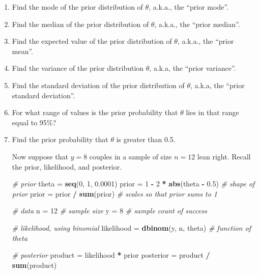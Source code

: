\documentclass[
]{book}
\newenvironment{Shaded}{\begin{snugshade}}{\end{snugshade}}
\newcommand{\CommentTok}[1]{\textcolor[rgb]{0.56,0.35,0.01}{\textit{#1}}}
\newcommand{\DecValTok}[1]{\textcolor[rgb]{0.00,0.00,0.81}{#1}}
\newcommand{\FloatTok}[1]{\textcolor[rgb]{0.00,0.00,0.81}{#1}}
\newcommand{\KeywordTok}[1]{\textcolor[rgb]{0.13,0.29,0.53}{\textbf{#1}}}
\newcommand{\NormalTok}[1]{#1}
\newcommand{\OperatorTok}[1]{\textcolor[rgb]{0.81,0.36,0.00}{\textbf{#1}}}
\newcommand{\StringTok}[1]{\textcolor[rgb]{0.31,0.60,0.02}{#1}}
\theoremstyle{definition}
\theoremstyle{definition}
\theoremstyle{definition}
\theoremstyle{remark}
\begin{document}
\begin{enumerate}
\def\labelenumi{\arabic{enumi}.}
\item
  Find the mode of the prior distribution of \(\theta\), a.k.a., the ``prior mode''.
\item
  Find the median of the prior distribution of \(\theta\), a.k.a., the ``prior median''.
\item
  Find the expected value of the prior distribution of \(\theta\), a.k.a., the ``prior mean''.
\item
  Find the variance of the prior distribution \(\theta\), a.k.a, the ``prior variance''.
\item
  Find the standard deviation of the prior distribution of \(\theta\), a.k.a, the ``prior standard deviation''.
\item
  For what range of values is the prior probability that \(\theta\) lies in that range equal to 95\%?
\item
  Find the prior probability that \(\theta\) is greater than 0.5.

  Now suppose that \(y=8\) couples in a sample of size \(n=12\) lean right. Recall the prior, likelihood, and posterior.

\begin{Shaded}
\begin{Highlighting}[]
\CommentTok{\# prior}
\NormalTok{theta =}\StringTok{ }\KeywordTok{seq}\NormalTok{(}\DecValTok{0}\NormalTok{, }\DecValTok{1}\NormalTok{, }\FloatTok{0.0001}\NormalTok{)}
\NormalTok{prior =}\StringTok{ }\DecValTok{1} \OperatorTok{{-}}\StringTok{ }\DecValTok{2} \OperatorTok{*}\StringTok{ }\KeywordTok{abs}\NormalTok{(theta }\OperatorTok{{-}}\StringTok{ }\FloatTok{0.5}\NormalTok{) }\CommentTok{\# shape of prior}
\NormalTok{prior =}\StringTok{ }\NormalTok{prior }\OperatorTok{/}\StringTok{ }\KeywordTok{sum}\NormalTok{(prior) }\CommentTok{\# scales so that prior sums to 1}

\CommentTok{\# data}
\NormalTok{n =}\StringTok{ }\DecValTok{12} \CommentTok{\# sample size}
\NormalTok{y =}\StringTok{ }\DecValTok{8} \CommentTok{\# sample count of success}

\CommentTok{\# likelihood, using binomial}
\NormalTok{likelihood =}\StringTok{ }\KeywordTok{dbinom}\NormalTok{(y, n, theta) }\CommentTok{\# function of theta}

\CommentTok{\# posterior}
\NormalTok{product =}\StringTok{ }\NormalTok{likelihood }\OperatorTok{*}\StringTok{ }\NormalTok{prior}
\NormalTok{posterior =}\StringTok{ }\NormalTok{product }\OperatorTok{/}\StringTok{ }\KeywordTok{sum}\NormalTok{(product)}
\end{Highlighting}
\end{Shaded}


\end{enumerate}
\end{document}
